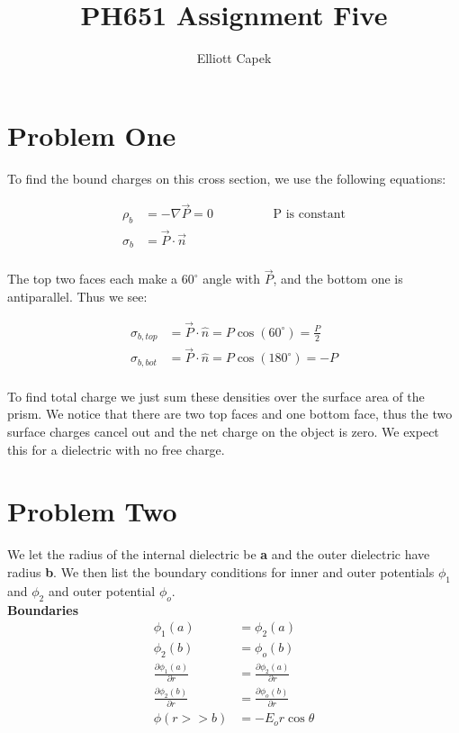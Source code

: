 \documentclass[10pt]{article} %
\title{PH651 Assignment Five}
\author{Elliott Capek}
\begin{document}
\maketitle{}

\section{Problem One}
To find the bound charges on this cross section, we use the following equations:

\begin{align*}
  \rho_b &= -\nabla \vec{P} = 0\hspace{2cm} \mbox{P is constant}\\
  \sigma_b &= \vec{P} \cdot \vec{n}\\
\end{align*}

The top two faces each make a $60^\circ$ angle with $\vec{P}$, and the bottom one is antiparallel. Thus we see:

\begin{align*}
  \sigma_{b,top} &= \vec{P} \cdot \hat{n} = P\cos\left(60^\circ\right) = \frac P2\\
  \sigma_{b,bot} &= \vec{P} \cdot \hat{n} = P\cos\left(180^\circ\right) = -P\\
\end{align*}

To find total charge we just sum these densities over the surface area of the prism. We notice that there are two top faces and one
bottom face, thus the two surface charges cancel out and the net charge on the object is zero. We expect this for a dielectric with
no free charge.

\section{Problem Two}
We let the radius of the internal dielectric be \textbf{a} and the outer dielectric have radius \textbf{b}. We then list the
boundary conditions for inner and outer potentials $\phi_1$ and $\phi_2$ and outer potential $\phi_o$.\\

\textbf{Boundaries}
\begin{align*}
  \phi_1(a) &= \phi_2(a)\\
  \phi_2(b) &= \phi_o(b)\\
  \frac{\partial \phi_1(a)}{\partial r} &= \frac{\partial \phi_2(a)}{\partial r}\\
  \frac{\partial \phi_2(b)}{\partial r} &= \frac{\partial \phi_o(b)}{\partial r}\\
  \phi(r>>b) &= -E_or\cos\theta
\end{align*}
\end{document}
